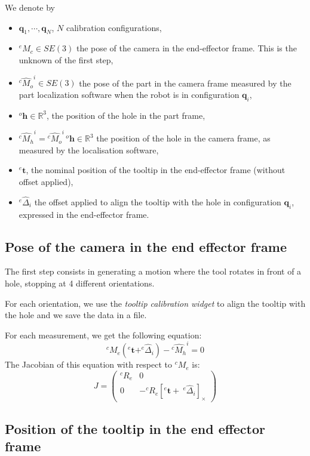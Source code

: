 \documentclass {article}
\newcommand\conf{\mathbf{q}}
\newcommand\transf[2]{^{#1}M_{#2}}
\newcommand\linvel{\mathbf{v}}
\newcommand\angvel{\omega}
\newcommand\cross[1]{\left[#1\right]_{\times}}
\newcommand\hole{\mathbf{h}}
\newcommand\tool{\mathbf{t}}
\newcommand{\reals}{\mathbb{R}}
\begin{document}
We denote by
\begin{itemize}
\item $\conf_1,\cdots,\conf_N$, $N$ calibration configurations,
\item $\transf{e}{c}\in SE(3)$ the pose of the camera in the end-effector frame. This
  is the unknown of the first step,
\item $\hat{\transf{c}{o}}^i\in SE(3)$ the pose of the part in the camera frame measured by the part localization software when the robot is in configuration $\conf_i$,
\item $^{o}\hole\in\reals^3$, the position of the hole in the part frame,
\item $\hat{\transf{c}{h}}^i = \hat{\transf{c}{o}}^i\, ^{o}\hole\in\reals^3$ the position of the hole in the camera frame, as measured by the localisation software,
\item $^{e}\tool$, the nominal position of the tooltip in the end-effector frame (without offset applied),
\item $^{e}\hat{\Delta}_i$ the offset applied to align the tooltip with the hole in configuration $\conf_i$, expressed in the end-effector frame.
\end{itemize}

\subsection{Pose of the camera in the end effector frame}

The first step consists in generating a motion where the tool rotates in front
of a hole, stopping at 4 different orientations.

For each orientation, we use the \textit{tooltip calibration widget} to align
the tooltip with the hole and we save the data in a file.

For each measurement, we get the following equation:
$$
\transf{c}{e}(^e\tool + ^{e}\hat{\Delta}_i) - \hat{\transf{c}{h}}^i = 0
$$
The Jacobian of this equation with respect to $\transf{c}{e}$ is:
$$
J = \left(\begin{array}{cc} ^{c}R_{e} & 0 \\ 0 & -^{c}R_{e}\cross{^e\tool +\ ^{e}\hat{\Delta}_i}\end{array}\right)
$$
\subsection{Position of the tooltip in the end effector frame}
\end{document}
